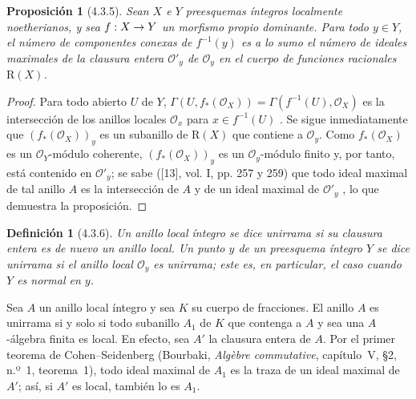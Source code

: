 \documentclass[10pt,oneside,openany]{book}
\theoremstyle{egaenv}\newtheorem*{env}{---}
\theoremstyle{egastatement}
\newtheorem*{proposition}{Proposición}
\theoremstyle{egadescription}
\newtheorem*{definition}{Definición}
\newcommand{\oldpage}[2][]{\marginnote{\normalfont\scriptsize\textbf{#1}\,|\,#2}\ignorespaces}
\renewcommand{\to}{\mathchoice{\longrightarrow}{\rightarrow}{\rightarrow}{\rightarrow}}
\begin{document}
\begin{proposition}[4.3.5]
\label{III.4.3.5}
\label{III.4.3.5-fr}
Sean $X$ e $Y$ preesquemas íntegros localmente noetherianos, y sea
$f:X\to Y$ un morfismo propio dominante. Para todo $y\in Y$, el
número de componentes conexas de $f^{-1}(y)$ es a lo sumo el número
de ideales maximales de la clausura entera $\mathcal O'_y$ de
$\mathcal O_y$ en el cuerpo de funciones racionales $\mathrm R(X)$.
\end{proposition}

\begin{proof}
Para todo abierto $U$ de $Y$,
$\Gamma(U,f_*(\mathcal O_X))=\Gamma(f^{-1}(U),\mathcal O_X)$
es la intersección de los anillos locales $\mathcal O_x$ para
$x\in f^{-1}(U)$ . Se sigue inmediatamente que
$(f_*(\mathcal O_X))_y$ es un subanillo de $\mathrm R(X)$ que
contiene a $\mathcal O_y$. Como $f_*(\mathcal O_X)$ es un
$\mathcal O_Y$-módulo coherente, $(f_*(\mathcal O_X))_y$ es un
$\mathcal O_y$-módulo finito y, por tanto, está contenido en $\mathcal O'_y$; se
sabe ([13], vol. I, pp. 257 y 259) que todo ideal maximal de tal anillo
$A$ es la intersección de $A$ y de un ideal maximal de $\mathcal O'_y$
\cite[vol.~I, pp.~257 and 259]{I-13}, lo que demuestra la proposición.
\end{proof}

\begin{definition}[4.3.6]
\label{III.4.3.6}
\label{III.4.3.6-fr}
Un anillo local íntegro se dice unirrama si su clausura entera
es de nuevo un anillo local. Un punto $y$ de un preesquema íntegro
$Y$ se dice unirrama si el anillo local $\mathcal O_y$ es
unirrama; este es, en particular, el caso cuando $Y$ es \emph{normal} en
$y$.
\end{definition}

Sea $A$ un anillo local íntegro y sea $K$ su cuerpo de fracciones. El
anillo $A$ es unirrama si y solo si todo subanillo $A_1$ de $K$ que
contenga a $A$ y sea una $A$-álgebra finita es local. En efecto, sea
$A'$ la clausura entera de $A$. Por el primer teorema de
Cohen--Seidenberg (Bourbaki, \emph{Alg\`ebre commutative}, capítulo~V,
\S2, n.º~1, teorema~1), todo ideal maximal de $A_1$ es la traza
de un ideal maximal de $A'$; así, si $A'$ es local, también
lo es $A_1$.

\oldpage[III]{133}
\end{document}
